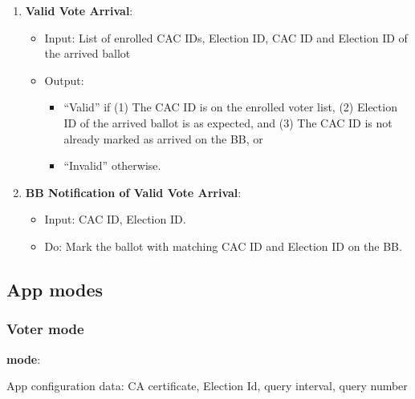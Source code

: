 \documentclass{article}
\begin{document}
\begin{enumerate}
    \item \textbf{Valid Vote Arrival}:
\begin{itemize}
    \item Input: List of enrolled CAC IDs, Election ID, CAC ID and Election ID of the arrived ballot
    \item Output: 
    \begin{itemize}
        \item ``Valid'' if     (1) The CAC ID is on the enrolled voter list, (2) Election ID of the arrived ballot is as expected, and (3) The CAC ID is not already marked as arrived on the BB, or
        \item ``Invalid'' otherwise.

    \end{itemize}
\end{itemize}
\label{Valid Vote Arrival}
    \item \textbf{BB Notification of Valid Vote Arrival}:
\begin{itemize}
    \item Input: CAC ID, Election ID.
    \item Do: Mark the ballot with matching CAC ID and Election ID on the BB.

\end{itemize}
\label{BB Notification of Valid Vote Arrival}
\end{enumerate}

    

\subsection{App modes}
\subsubsection{Voter mode}

\textbf{\BBInclusionCheck{} mode}:


App configuration data: CA certificate, Election Id, query interval, query number
\end{document}
